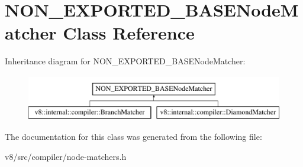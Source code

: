 \hypertarget{classNON__EXPORTED__BASENodeMatcher}{}\section{N\+O\+N\+\_\+\+E\+X\+P\+O\+R\+T\+E\+D\+\_\+\+B\+A\+S\+E\+Node\+Matcher Class Reference}
\label{classNON__EXPORTED__BASENodeMatcher}
Inheritance diagram for N\+O\+N\+\_\+\+E\+X\+P\+O\+R\+T\+E\+D\+\_\+\+B\+A\+S\+E\+Node\+Matcher\+:\begin{figure}[H]
\begin{center}
\leavevmode
\includegraphics[height=2.000000cm]{classNON__EXPORTED__BASENodeMatcher}
\end{center}
\end{figure}


The documentation for this class was generated from the following file\+:\begin{DoxyCompactItemize}
\item 
v8/src/compiler/node-\/matchers.\+h\end{DoxyCompactItemize}
